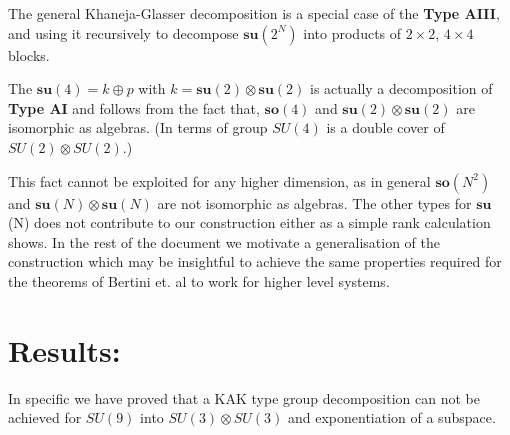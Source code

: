 The general Khaneja-Glasser \cite{KhanejaGlasser, divakaran1980decomposition} decomposition is a special case of the \textbf{Type AIII}, and using it recursively to decompose $\mathbf{su}(2^N)$ into products of $2\times2$, $4\times4$ blocks.

The $\mathbf{su}(4) = k \oplus p$ with $k=\mathbf{su}(2) \otimes \mathbf{su}(2)$ is actually a decomposition of \textbf{Type AI} and follows from the fact that, $\mathbf{so}(4)$ and $\mathbf{su}(2) \otimes \mathbf{su}(2)$ are isomorphic as algebras. (In terms of group $SU(4)$ is a double cover of $SU(2) \otimes SU(2)$.)

This fact cannot be exploited for any higher dimension, as in general $\mathbf{so}(N^2)$ and $\mathbf{su}(N) \otimes \mathbf{su}(N)$ are not isomorphic as algebras. The other types for $\mathbf{su}$(N) does not contribute to our construction either as a simple rank calculation shows. In the rest of the document we motivate a generalisation of the construction which may be insightful to achieve the same properties required for the theorems of Bertini et. al \cite{Bertini1} to work for higher level systems.

\section*{Results:}

In specific we have proved that a KAK type group decomposition can not be achieved for $SU(9)$ into  $SU(3)\otimes SU(3)$ and exponentiation of a subspace.